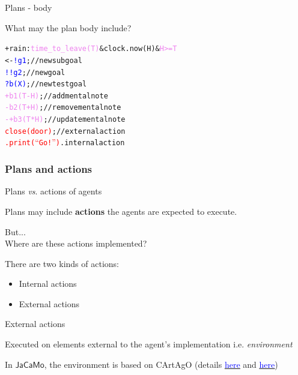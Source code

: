 \documentclass[compress]{beamer}
\newcommand{\jacamo}{$\mathsf{JaCaMo}$\xspace}
\newcommand{\link}[2]{\href{#1}{\underline{\textcolor{blue}{#2}}}}
\newcommand{\planhead}[1]{\textcolor{indiagreen}{#1}}
\newcommand{\desire}[1]{\textcolor{blue}{#1}}
\newcommand{\instruction}[1]{\textcolor{red}{#1}}
\newcommand{\comment}[1]{\textcolor{harvestgold}{#1}}
\newcommand{\belief}[1]{\textcolor{violet}{#1}}
\begin{document}
\begin{frame}[fragile]{Plans - body} 
 
What may the plan body include?
 
 \begin{alltt}\scriptsize
    \planhead{+rain} : \belief{time\_to\_leave(T)} \& clock.now(H) \& \belief{H>=T}
       <- \desire{!g1}; \comment{//new subgoal}
          \desire{!!g2}; \comment{//new goal}
          \desire{?b(X)}; \comment{//new test goal}
          \belief{+b1(T-H)}; \comment{//add mental note}
          \belief{-b2(T+H)}; \comment{//remove mental note}
          \belief{-+b3(T*H)}; \comment{//update mental note}
          \instruction{close(door)}; \comment{//external action}
          \instruction{.print(``Go!'')}. \comment{internal action}
 \end{alltt}

 
 
\end{frame}

\subsubsection{Plans and actions}
\begin{frame}{Plans \textit{vs}. actions of agents}

\footnotesize

Plans may include {\bf actions} the agents are expected to execute.\\ \vspace{1cm}

But...\\
Where are these actions implemented? \vspace{1cm}

There are two kinds of actions:
\begin{itemize}
 \item Internal actions
 \item External actions
\end{itemize}
 
\end{frame}

\begin{frame}{External actions}
 
 Executed on elements external to the agent's implementation
 {\tiny i.e. \textit{environment}}\\ 
 
 \vspace{.5cm}
 
 In \jacamo, the environment is based on \textsf{CArtAgO} {\tiny (details \link{http://cartago.sourceforge.net/}{here} and \link{https://raw.githubusercontent.com/CArtAgO-lang/cartago/master/docs/cartago_by_examples/cartago_by_examples.pdf}{here})}
 

\end{frame}
 
\end{document}

